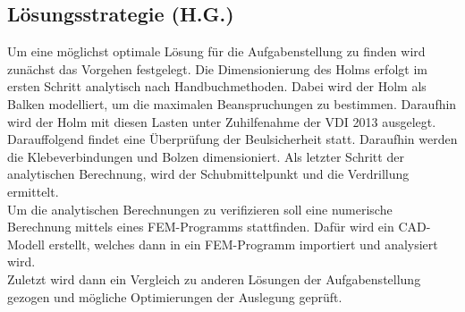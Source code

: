 \subsection{Lösungsstrategie (H.G.)}
Um eine möglichst optimale Lösung für die Aufgabenstellung zu finden wird zunächst das Vorgehen festgelegt. Die Dimensionierung des Holms erfolgt im ersten Schritt analytisch nach Handbuchmethoden. Dabei wird der Holm als Balken modelliert, um die maximalen Beanspruchungen zu bestimmen. Daraufhin wird der Holm mit diesen Lasten unter Zuhilfenahme der VDI 2013 ausgelegt. Darauffolgend findet eine Überprüfung der Beulsicherheit statt. Daraufhin werden die Klebeverbindungen und Bolzen dimensioniert. Als letzter Schritt der analytischen Berechnung, wird der Schubmittelpunkt und die Verdrillung ermittelt.\\
Um die analytischen Berechnungen zu verifizieren soll eine numerische Berechnung mittels eines FEM-Programms stattfinden. Dafür wird ein CAD-Modell erstellt, welches dann in ein FEM-Programm importiert und analysiert wird.\\
Zuletzt wird dann ein Vergleich zu anderen Lösungen der Aufgabenstellung gezogen und mögliche Optimierungen der Auslegung geprüft.

